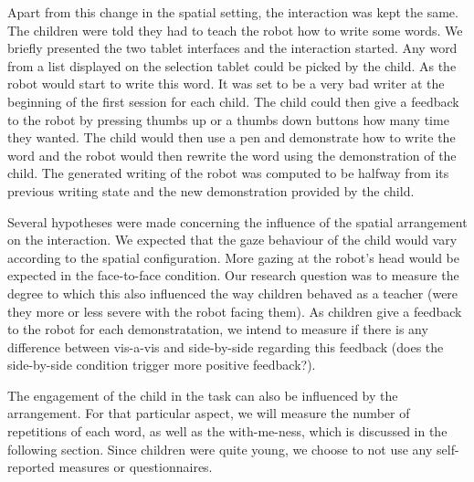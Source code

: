 \documentclass[letterpaper, 10 pt, conference]{ieeeconf}  %
\begin{document}
Apart from this change in the spatial setting, the interaction was kept the same. 
The children were told they had to teach the robot how to write some words. 
We briefly presented the two tablet interfaces and the interaction started.
Any word from a list displayed on the selection tablet could be picked by the child.
As the robot would start to write this word. It was set to be a very bad writer at the beginning of the first session for each child.
The child could then give a feedback to the robot by pressing thumbs up or a thumbs down buttons how many time they wanted.
The child would then use a pen and demonstrate how to write the word and the robot would then rewrite the word using the demonstration of the child.
The generated writing of the robot was computed to be halfway from its previous writing state and the new demonstration provided by the child.

Several hypotheses were made concerning the influence of the spatial arrangement on the interaction.
We expected that the gaze behaviour of the child would vary according to the spatial configuration.
More gazing at the robot's head would be expected in the face-to-face condition.
Our research question was to measure the degree to which this also influenced the way children behaved as a teacher (were they more or less severe with the robot facing them).
As children give a feedback to the robot for each demonstratation, we intend to measure if there is any difference between vis-a-vis and side-by-side regarding this feedback (does the side-by-side condition trigger more positive feedback?).

The engagement of the child in the task can also be influenced by the arrangement.
For that particular aspect, we will measure the number of repetitions of each word, as well as the with-me-ness, which is discussed in the following section.
Since children were quite young, we choose to not use any self-reported measures or questionnaires.
\end{document}
